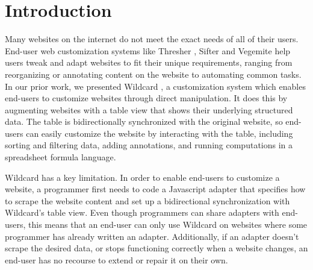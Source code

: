 \documentclass[sigconf,10pt]{acmart}
\begin{document}



\maketitle

\hypertarget{sec:introduction}{%
\section{Introduction}\label{sec:introduction}}

Many websites on the internet do not meet the exact needs of all of
their users. End-user web customization systems like Thresher
\citep{hogue2005}, Sifter \citep{huynh2006} and Vegemite \citep{lin2009}
help users tweak and adapt websites to fit their unique requirements,
ranging from reorganizing or annotating content on the website to
automating common tasks. In our prior work, we presented Wildcard
\citep{litt2020a}, a customization system which enables end-users to
customize websites through direct manipulation. It does this by
augmenting websites with a table view that shows their underlying
structured data. The table is bidirectionally synchronized with the
original website, so end-users can easily customize the website by
interacting with the table, including sorting and filtering data, adding
annotations, and running computations in a spreadsheet formula language.

Wildcard has a key limitation. In order to enable end-users to customize
a website, a programmer first needs to code a Javascript adapter that
specifies how to scrape the website content and set up a bidirectional
synchronization with Wildcard's table view. Even though programmers can
share adapters with end-users, this means that an end-user can only use
Wildcard on websites where some programmer has already written an
adapter. Additionally, if an adapter doesn't scrape the desired data, or
stops functioning correctly when a website changes, an end-user has no
recourse to extend or repair it on their own.
\end{document}
